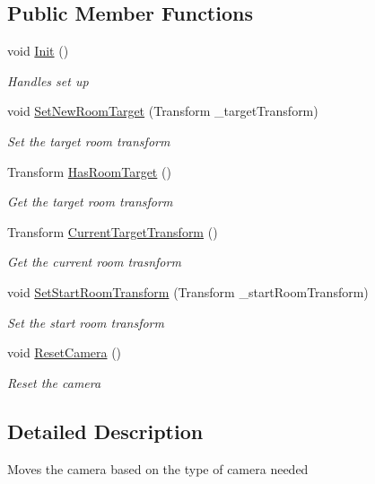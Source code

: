 \subsection*{Public Member Functions}
\begin{DoxyCompactItemize}
\item 
void \mbox{\hyperlink{class_camera_movement_a9203ee195c435d40bf4fc1de221ed0cd}{Init}} ()
\begin{DoxyCompactList}\small\item\em Handles set up \end{DoxyCompactList}\item 
void \mbox{\hyperlink{class_camera_movement_a198122a1f8e338c1bfe843a0f4f6ce96}{Set\+New\+Room\+Target}} (Transform \+\_\+target\+Transform)
\begin{DoxyCompactList}\small\item\em Set the target room transform \end{DoxyCompactList}\item 
Transform \mbox{\hyperlink{class_camera_movement_a6129de38ce5788f51e7427417bdf7a98}{Has\+Room\+Target}} ()
\begin{DoxyCompactList}\small\item\em Get the target room transform \end{DoxyCompactList}\item 
Transform \mbox{\hyperlink{class_camera_movement_ad707fba6a3e906310efa90dd4285a407}{Current\+Target\+Transform}} ()
\begin{DoxyCompactList}\small\item\em Get the current room trasnform \end{DoxyCompactList}\item 
void \mbox{\hyperlink{class_camera_movement_a22e6e76309d99376ead5b3dffd474938}{Set\+Start\+Room\+Transform}} (Transform \+\_\+start\+Room\+Transform)
\begin{DoxyCompactList}\small\item\em Set the start room transform \end{DoxyCompactList}\item 
void \mbox{\hyperlink{class_camera_movement_a06848ed3326e21d52be8c25ecfe12843}{Reset\+Camera}} ()
\begin{DoxyCompactList}\small\item\em Reset the camera \end{DoxyCompactList}\end{DoxyCompactItemize}


\subsection{Detailed Description}
Moves the camera based on the type of camera needed 



